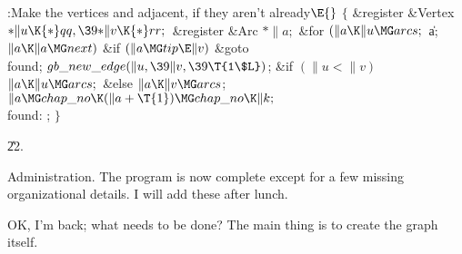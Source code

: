 \B{}:Make the vertices  and  adjacent,
if they aren't already\X${}\E{}$\6
${}\{{}$\5
\1\&{register} \&{Vertex} ${}{*}\|u\K{*}\\{qq},\39{*}\|v\K{*}\\{rr};{}$\6
\&{register} \&{Arc} ${}{*}\|a;{}$\7
\&{for} ${}(\|a\K\|u\MG\\{arcs};{}$ \|a; ${}\|a\K\|a\MG\\{next}){}$\1\6
\&{if} ${}(\|a\MG\\{tip}\E\|v){}$\1\5
\&{goto} \\{found};\2\2\6
${}\\{gb\_new\_edge}(\|u,\39\|v,\39\T{1\$L}){}$;\6
\&{if} ${}(\|u<\|v){}$\1\5
${}\|a\K\|u\MG\\{arcs};{}$\2\6
\&{else}\1\5
${}\|a\K\|v\MG\\{arcs}{}$;\2\6
${}\|a\MG\\{chap\_no}\K(\|a+\T{1})\MG\\{chap\_no}\K\|k;{}$\6
\4\\{found}:\5
;\6
\4${}\}{}$\2\par
\U22.\fi

Administration.
The program is now complete except for a few missing organizational details.
I will add these after lunch.

\fi

OK, I'm back; what needs to be done? The main thing is to create
the graph itself.

